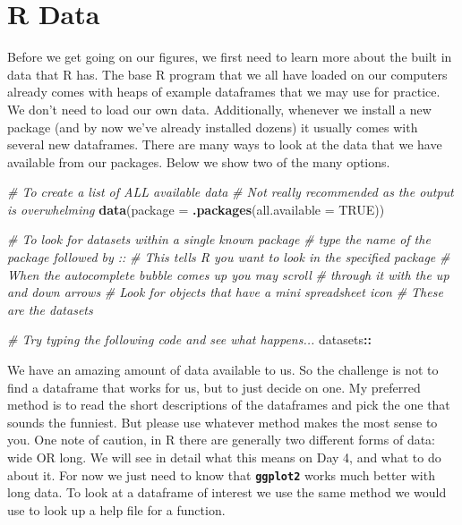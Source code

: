 \documentclass[
]{book}
\newenvironment{Shaded}{\begin{snugshade}}{\end{snugshade}}
\newcommand{\CommentTok}[1]{\textcolor[rgb]{0.56,0.35,0.01}{\textit{#1}}}
\newcommand{\DataTypeTok}[1]{\textcolor[rgb]{0.13,0.29,0.53}{#1}}
\newcommand{\KeywordTok}[1]{\textcolor[rgb]{0.13,0.29,0.53}{\textbf{#1}}}
\newcommand{\NormalTok}[1]{#1}
\newcommand{\OperatorTok}[1]{\textcolor[rgb]{0.81,0.36,0.00}{\textbf{#1}}}
\newcommand{\OtherTok}[1]{\textcolor[rgb]{0.56,0.35,0.01}{#1}}
\begin{document}
\hypertarget{r-data}{%
\section{R Data}\label{r-data}}

Before we get going on our figures, we first need to learn more about the built in data that R has. The base R program that we all have loaded on our computers already comes with heaps of example dataframes that we may use for practice. We don't need to load our own data. Additionally, whenever we install a new package (and by now we've already installed dozens) it usually comes with several new dataframes. There are many ways to look at the data that we have available from our packages. Below we show two of the many options.

\begin{Shaded}
\begin{Highlighting}[]
\CommentTok{\# To create a list of ALL available data}
  \CommentTok{\# Not really recommended as the output is overwhelming}
\KeywordTok{data}\NormalTok{(}\DataTypeTok{package =} \KeywordTok{.packages}\NormalTok{(}\DataTypeTok{all.available =} \OtherTok{TRUE}\NormalTok{))}

\CommentTok{\# To look for datasets within a single known package}
  \CommentTok{\# type the name of the package followed by \textquotesingle{}::\textquotesingle{}}
  \CommentTok{\# This tells R you want to look in the specified package}
  \CommentTok{\# When the autocomplete bubble comes up you may scroll}
  \CommentTok{\# through it with the up and down arrows}
  \CommentTok{\# Look for objects that have a mini spreadsheet icon}
  \CommentTok{\# These are the datasets}

\CommentTok{\# Try typing the following code and see what happens...}
\NormalTok{datasets}\OperatorTok{::}
\end{Highlighting}
\end{Shaded}

We have an amazing amount of data available to us. So the challenge is not to find a dataframe that works for us, but to just decide on one. My preferred method is to read the short descriptions of the dataframes and pick the one that sounds the funniest. But please use whatever method makes the most sense to you. One note of caution, in R there are generally two different forms of data: wide OR long. We will see in detail what this means on Day 4, and what to do about it. For now we just need to know that \textbf{\texttt{ggplot2}} works much better with long data. To look at a dataframe of interest we use the same method we would use to look up a help file for a function.
\end{document}
